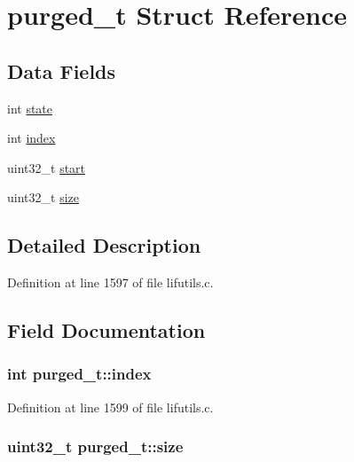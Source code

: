 \hypertarget{structpurged__t}{}\section{purged\+\_\+t Struct Reference}
\label{structpurged__t}
\subsection*{Data Fields}
\begin{DoxyCompactItemize}
\item 
int \hyperlink{structpurged__t_a2c08c2063d9649c18d5316a50cf5bec6}{state}
\item 
int \hyperlink{structpurged__t_a55e17d8d1618d28e79b75908367d34a9}{index}
\item 
uint32\+\_\+t \hyperlink{structpurged__t_afeb1148800092fe0b7e73a9dc6839a37}{start}
\item 
uint32\+\_\+t \hyperlink{structpurged__t_ab854d8b2eda17fe05b3dac138e3f70da}{size}
\end{DoxyCompactItemize}


\subsection{Detailed Description}


Definition at line 1597 of file lifutils.\+c.



\subsection{Field Documentation}
\subsubsection[{\texorpdfstring{index}{index}}]{\setlength{\rightskip}{0pt plus 5cm}int purged\+\_\+t\+::index}\hypertarget{structpurged__t_a55e17d8d1618d28e79b75908367d34a9}{}\label{structpurged__t_a55e17d8d1618d28e79b75908367d34a9}


Definition at line 1599 of file lifutils.\+c.

\subsubsection[{\texorpdfstring{size}{size}}]{\setlength{\rightskip}{0pt plus 5cm}uint32\+\_\+t purged\+\_\+t\+::size}\hypertarget{structpurged__t_ab854d8b2eda17fe05b3dac138e3f70da}{}\label{structpurged__t_ab854d8b2eda17fe05b3dac138e3f70da}


